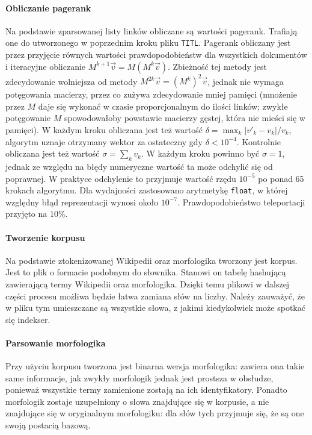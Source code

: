\documentclass[a4paper,12pt]{article}
\begin{document}
\paragraph{Obliczanie pagerank} Na podstawie zparsowanej listy linków obliczane
są wartości pagerank. Trafiają one do utworzonego w poprzednim kroku pliku
\texttt{TITL}. Pagerank obliczany jest przez przyjęcie równych wartości
prawdopodobieństw dla wszystkich dokumentów i iteracyjne obliczanie
$M^{k+1} \vec v = M(M^k \vec v)$. Zbieżność tej metody jest zdecydowanie
wolniejsza od metody $M^{2k} \vec v = (M^k)^2 \vec v$, jednak nie wymaga
potęgowania macierzy, przez co zużywa zdecydowanie mniej pamięci (mnożenie przez
$M$ daje się wykonać w czasie proporcjonalnym do ilości linków; zwykłe
potęgowanie $M$ spowodowałoby powstawie macierzy gęstej, która nie mieści się
w pamięci). W każdym kroku obliczana jest też wartość $\delta = \max_k |v'_k - v_k|/v_k$,
algorytm uznaje otrzymany wektor za ostateczny gdy $\delta < 10^{-4}$. Kontrolnie
obliczana jest też wartość $\sigma = \sum_k v_k$. W każdym kroku powinno być
$\sigma = 1$, jednak ze względu na błędy numeryczne wartość ta może odchylić
się od poprawnej. W praktyce odchylenie to przyjmuje wartość rzędu $10^{-5}$
po ponad 65 krokach algorytmu. Dla wydajności zastosowano arytmetykę
\texttt{float}, w której względny błąd reprezentacji wynosi około $10^{-7}$.
Prawdopodobieństwo teleportacji przyjęto na $10\%$.

\paragraph{Tworzenie korpusu} Na podstawie ztokenizowanej Wikipedii oraz
morfologika tworzony jest korpus. Jest to plik o formacie podobnym do
słownika. Stanowi on tabelę hashującą zawierającą termy Wikipedii oraz
morfologika. Dzięki temu plikowi w dalszej części procesu możliwa będzie
łatwa zamiana słów na liczby. Należy zauważyć, że w pliku tym umieszczane są
wszystkie słowa, z jakimi kiedykolwiek może spotkać się indekser.

\paragraph{Parsowanie morfologika} Przy użyciu korpusu tworzona jest binarna
wersja morfologika: zawiera ona takie same informacje, jak zwykły morfologik
jednak jest prostsza w obsłudze, ponieważ wszystkie termy zamienione zostają
na ich identyfikatory. Ponadto morfologik zostaje uzupełniony o słowa
znajdujące się w korpusie, a nie znajdujące się w oryginalnym morfologiku:
dla słów tych przyjmuje się, że są one swoją postacią bazową.
\end{document}
